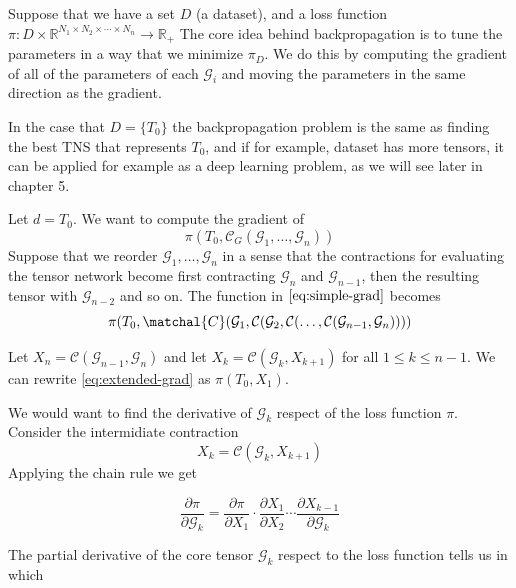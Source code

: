 \documentclass[11pt,a4paper,openright,oneside]{book}
\numberwithin{equation}{section}
\begin{document}
{Suppose that we have a set $D$ (a dataset), and a loss function ${\pi: D \times \mathbb{R}^{N_1 \times N_2 \times \cdots \times N_n} \rightarrow \mathbb{R}_+}$
The core idea behind backpropagation is to tune the parameters in a way that
we minimize $\pi_D$. We do this by computing the gradient of all of the parameters of each $\mathcal{G}_i$ and moving 
the parameters in the same direction as the gradient.

In the case that $D = \{T_0\}$ the backpropagation problem is the same as finding the best TNS that represents $T_0$, and if
for example, dataset has more tensors, it can be applied for example as a deep learning problem, as we will see later in chapter 5.

Let $d = T_0$. We want to compute the gradient of
\begin{equation}
\pi(T_0, \mathcal{C}_G(\mathcal{G}_1, \dots, \mathcal{G}_n))
\label{eq:simple-grad}
\end{equation}
Suppose that we reorder $\mathcal{G}_1, \dots, \mathcal{G}_n$ in a sense that the contractions for evaluating the tensor
network become first contracting $\mathcal{G}_n$ and $\mathcal{G}_{n-1}$, then the resulting tensor with $\mathcal{G}_{n-2}$
and so on. The function in $\ref{eq:simple-grad}$ becomes
\begin{equation}
    \pi(T_0, \matchal{C}(\mathcal{G}_1, \mathcal{C}( \mathcal{G}_2, \mathcal{C}(\dots, \mathcal{C}(\mathcal{G}_{n-1}, \mathcal{G}_n))))
    \label{eq:extended-grad}
\end{equation}

Let $X_n = \mathcal{C}(\mathcal{G}_{n-1}, \mathcal{G}_n)$ and let $X_{k} = \mathcal{C}(\mathcal{G}_k, X_{k+1})$ for all $1 \leqslant k \leqslant n - 1$.
We can rewrite \ref{eq:extended-grad} as $\pi(T_0, X_1)$.

We would want to find the derivative of $\mathcal{G}_k$ respect of the loss function $\pi$. Consider the intermidiate
contraction $$X_k = \mathcal{C}(\mathcal{G}_k, X_{k+1})$$
Applying the chain rule we get

\begin{equation}
    \frac{\partial \pi}{\partial \mathcal{G}_k} = \frac{\partial \pi}{\partial X_1} \cdot \frac{\partial X_1}{\partial X_2} \cdots
    \frac{\partial X_{k-1}}{\partial \mathcal{G}_{k}}
\end{equation}

The partial derivative of the core tensor $\mathcal{G}_k$ respect to the loss function tells us in which 

}
\end{document}
